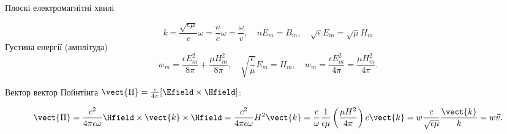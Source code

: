 \documentclass[onlytextwidth]{beamer}
\begin{document}
\begin{frame}[t]{Плоскі електромагнітні хвилі}
\begin{onlyenv}
		\begin{equation*}
			k =  \frac{\sqrt{\epsilon\mu}}{c} \omega = \frac{n}{c} \omega = \frac{\omega}{v}, \quad n E_m = B_m, \quad \sqrt{\epsilon} E_m = \sqrt{\mu} H_m
		\end{equation*}
		Густина енергії (амплітуда)
		\begin{equation*}
			w_m = \frac{\epsilon E_m^2}{8\pi} + \frac{\mu H_m^2}{8\pi}, \quad  \sqrt{\frac{\epsilon}{\mu}} E_m = H_m, \quad w_m = \frac{\epsilon E_m^2}{4\pi} = \frac{\mu H_m^2}{4\pi}.
		\end{equation*}

		Вектор вектор Пойнтінга $ \vect{\Pi} = \frac{c}{4\pi}[\Efield\times\Hfield] $:


		\begin{equation*}
			\vect{\Pi} =  \frac{c^2}{4\pi\epsilon \omega} \Hfield\times\vect{k}\times\Hfield = \frac{c^2}{4\pi\epsilon \omega} H^2 \vect{k} =
			\frac{c}{\omega} \frac{1}{\epsilon\mu}\left( \frac{\mu H^2}{4\pi}\right)   c \vect{k} = w \frac{c}{\sqrt{\epsilon\mu}} \frac{\vect{k}}{k}= w
			\vec{v}.
		\end{equation*}
	\end{onlyenv}
\end{frame}
\end{document}
